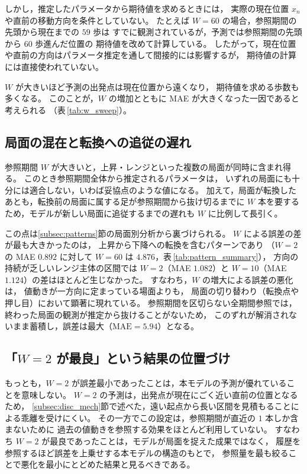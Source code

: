 \documentclass[a4j,dvipdfmx]{jsarticle}
\theoremstyle{plainnote}
\begin{document}
しかし，推定したパラメータから期待値を求めるときには，
実際の現在位置 $x_n$ や直前の移動方向を条件としていない。
たとえば $W=60$ の場合，参照期間の先頭から現在までの $59$ 歩は
すでに観測されているが，予測では参照期間の先頭から $60$ 歩進んだ位置の
期待値を改めて計算している。
したがって，現在位置や直前の方向はパラメータ推定を通して間接的には影響するが，
期待値の計算には直接使われていない。

$W$ が大きいほど予測の出発点は現在位置から遠くなり，
期待値を求める歩数も多くなる。
このことが，$W$ の増加とともに MAE が大きくなった一因であると考えられる
（表\,\ref{tab:w_sweep}）。

\subsection{局面の混在と転換への追従の遅れ}\label{subsec:disc_mix}

参照期間 $W$ が大きいと，上昇・レンジといった複数の局面が同時に含まれ得る。
このとき参照期間全体から推定されるパラメータは，
いずれの局面にも十分には適合しない，いわば妥協点のような値になる。
加えて，局面が転換したあとも，転換前の局面に属する足が参照期間から抜け切るまでに
$W$ 本を要するため，モデルが新しい局面に追従するまでの遅れも
$W$ に比例して長引く。

この点は\ref{subsec:patterns}節の局面別分析から裏づけられる。
$W$ による誤差の差が最も大きかったのは，
上昇から下降への転換を含むパターンであり
（$W=2$ の MAE $0.892$ に対して $W=60$ は $4.876$，表\,\ref{tab:pattern_summary}），
方向の持続が乏しいレンジ主体の区間では
$W=2$（MAE $1.082$）と $W=10$（MAE $1.124$）の差はほとんど生じなかった。
すなわち，$W$ の増大による誤差の悪化は，
値動きが一方向に定まっている場面よりも，
局面の切り替わり（転換点や押し目）において顕著に現れている。
参照期間を区切らない全期間参照では，
終わった局面の観測が推定から抜けることがないため，
このずれが解消されないまま蓄積し，誤差は最大（$\mathrm{MAE}=5.94$）となる。



\subsection{「$W=2$ が最良」という結果の位置づけ}

もっとも，$W=2$ が誤差最小であったことは，本モデルの予測が優れていることを意味しない。
$W=2$ の予測は，出発点が現在にごく近い直前の位置となるため，
\ref{subsec:disc_mech}節で述べた，遠い起点から長い区間を見積もることによる乖離を受けにくい。
その一方でこの設定は，参照期間が直近の $1$ 本しか含まないために
過去の値動きを参照する効果をほとんど利用していない。
すなわち $W=2$ が最良であったことは，モデルが局面を捉えた成果ではなく，
履歴を参照するほど誤差を上乗せする本モデルの構造のもとで，
参照量を最も絞ることで悪化を最小にとどめた結果と見るべきである。
\end{document}
